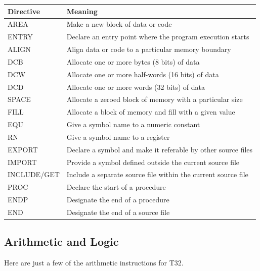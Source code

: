 \documentclass[12pt,letterpaper]{article} \usepackage{amsmath} \usepackage{graphicx} \usepackage[margin=1in]{geometry} \usepackage{longtable}  \usepackage{amssymb}
\begin{document}
	\begin{center}
		\begin{tabular}{|l|l|}
			\hline
			\textbf{Directive} & \textbf{Meaning} \\
			\hline\hline
			AREA & Make a new block of data or code \\
			ENTRY & Declare an entry point where the program execution starts \\
			ALIGN & Align data or code to a particular memory boundary \\
			DCB & Allocate one or more bytes (8 bits) of data \\
			DCW & Allocate one or more half-words (16 bits) of data \\
			DCD & Allocate one or more words (32 bits) of data \\
			SPACE & Allocate a zeroed block of memory with a particular size \\
			FILL & Allocate a block of memory and fill with a given value \\
			EQU & Give a symbol name to a numeric constant \\
			RN & Give a symbol name to a register \\
			EXPORT & Declare a symbol and make it referable by other source files \\
			IMPORT & Provide a symbol defined outside the current source file \\
			INCLUDE/GET & Include a separate source file within the current source file \\
			PROC & Declare the start of a procedure \\
			ENDP & Designate the end of a procedure \\
			END & Designate the end of a source file \\
			\hline
		\end{tabular}
	\end{center}
	
	\subsection{Arithmetic and Logic}
	
	Here are just a few of the arithmetic instructions for T32.
	
\end{document}
